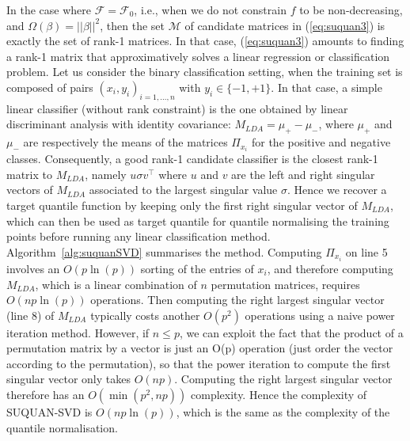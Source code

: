 \documentclass{article}
\newcommand{\Fcal}{\mathcal{F}}
\newcommand{\Mcal}{\mathcal{M}}
\begin{document}
In the case where $\Fcal = \Fcal_0$, i.e., when we do not constrain $f$ to be non-decreasing, and $\Omega(\beta) = ||\beta||^2$, then the set $\Mcal$ of candidate matrices in (\ref{eq:suquan3}) is exactly the set of rank-1 matrices. In that case, (\ref{eq:suquan3}) amounts to finding a rank-1 matrix that approximatively solves a linear regression or classification problem. Let us consider the binary classification setting, when the training set is composed of pairs $(x_i,y_i)_{i=1,\ldots,n}$ with $y_i\in\{-1,+1\}$. In that case, a simple linear classifier (without rank constraint) is the one obtained by linear discriminant analysis with identity covariance: $M_{LDA}=\mu_+ - \mu_-$, where $\mu_+$ and $\mu_-$ are respectively the means of the matrices $\Pi_{x_i}$ for the positive and negative classes. Consequently, a good rank-1 candidate classifier is the closest rank-1 matrix to $M_{LDA}$, namely $u\sigma v^\top$ where $u$ and $v$ are the left and right singular vectors of $M_{LDA}$ associated to the largest singular value $\sigma$. Hence we recover a target quantile function by keeping only the first right singular vector of $M_{LDA}$, which can then be used as target quantile for quantile normalising the training points before running any linear classification method. Algorithm~\ref{alg:suquanSVD} summarises the method. Computing $\Pi_{x_i}$ on line 5 involves an $O(p\ln(p))$ sorting of the entries of $x_i$, and therefore computing $M_{LDA}$, which is a linear combination of $n$ permutation matrices, requires $O(np\ln(p))$ operations. Then computing the right largest singular vector (line 8) of  $M_{LDA}$  typically costs another $O(p^2)$ operations using a naive power iteration method. However, if $n \leq p$, we can exploit the fact that the product of a permutation matrix by a vector is just an O(p) operation (just order the vector according to the permutation), so that the power iteration to compute the first singular vector only takes $O(np)$.  Computing the right largest singular vector therefore has an $O(\min(p^2, np))$ complexity. Hence the complexity of SUQUAN-SVD is $O(np\ln(p))$,  which is the same as the complexity of the quantile normalisation.
\end{document}

